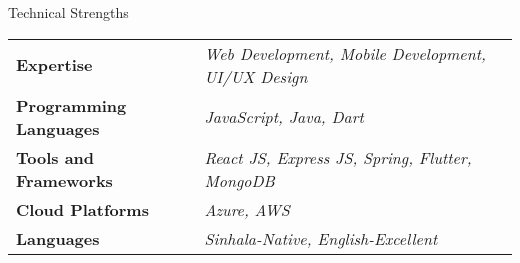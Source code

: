 \documentclass[
	11pt, %
]{./assets/resume} %
\begin{document}
	




\begin{rSection}{Technical Strengths}

	\def\arraystretch{1.5}

	\begin{tabular}{ l l}
		\textbf{Expertise} & \emph{Web Development, Mobile Development, UI/UX Design} \\
		\textbf{Programming Languages} & \emph{JavaScript, Java, Dart} \\
		\textbf{Tools and Frameworks} & \emph{React JS, Express JS, Spring, Flutter, MongoDB} \\ 
		\textbf{Cloud Platforms} & \emph{Azure, AWS} \\ 
		\textbf{Languages} & \emph{Sinhala-Native, English-Excellent} \\
	\end{tabular}

\end{rSection}
\end{document}
